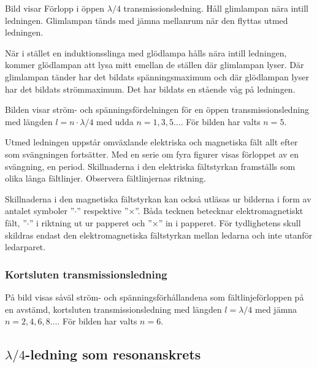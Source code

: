 
Bild  visar Förlopp i öppen $\lambda/4$
transmissionsledning.
Håll glimlampan nära intill ledningen.
Glimlampan tänds med jämna mellanrum när den flyttas utmed ledningen.

När i stället en induktionsslinga med glödlampa hålls nära intill ledningen,
kommer glödlampan att lysa mitt emellan de ställen där glimlampan lyser.
Där glimlampan tänder har det bildats spänningsmaximum och där glödlampan lyser
har det bildats strömmaximum.
Det har bildats en stående våg på ledningen.

Bilden visar ström- och spänningsfördelningen för en öppen transmissionsledning
med längden \(l = n\cdot\lambda/4\) med udda \(n = 1, 3, 5 \dots\).
För bilden har valts $n = 5$.

Utmed ledningen uppstår omväxlande elektriska och magnetiska fält allt
efter som svängningen fortsätter.
Med en serie om fyra figurer visas förloppet av en svängning, en period.
Skillnaderna i den elektriska fältstyrkan framställs som olika långa fältlinjer.
Observera fältlinjernas riktning.

Skillnaderna i den magnetiska fältstyrkan kan också utläsas ur
bilderna i form av antalet symboler ''\(\cdot\)'' respektive ''\(\times\)''.
Båda tecknen betecknar elektromagnetiskt fält, ''\(\cdot\)'' i riktning ut ur
papperet och ''\(\times\)'' in i papperet.
För tydlighetens skull skildras endast den elektromagnetiska fältstyrkan
mellan ledarna och inte utanför ledarparet.

\subsubsection{Kortsluten transmissionsledning}


På bild  visas såväl ström- och spänningsförhållandena som
fältlinjeförloppen på en avstämd, kortsluten transmissionsledning med
längden \(l = \lambda/4\) med jämna \(n = 2, 4, 6, 8 \dots\).
För bilden har valts \(n = 6\).

\subsection{$\lambda/4$-ledning som resonanskrets}

